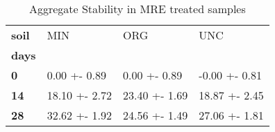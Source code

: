 \begin{table}
\centering
\caption{Aggregate Stability in MRE treated samples}
\label{<built-in method lower of str object at 0x7f2742205c38>_treated_main}
\begin{tabular}{llll}
\toprule
\textbf{soil} &            MIN &            ORG &            UNC \\
\textbf{days} &                &                &                \\
\midrule
\textbf{0   } &   0.00 +- 0.89 &   0.00 +- 0.89 &  -0.00 +- 0.81 \\
\textbf{14  } &  18.10 +- 2.72 &  23.40 +- 1.69 &  18.87 +- 2.45 \\
\textbf{28  } &  32.62 +- 1.92 &  24.56 +- 1.49 &  27.06 +- 1.81 \\
\bottomrule
\end{tabular}
\end{table}

